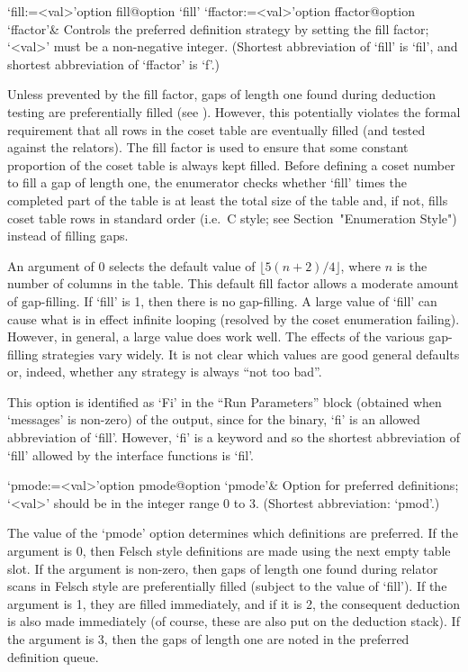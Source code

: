 \beginitems

\>`fill:=<val>'{option fill}@{option `fill'}
\>`ffactor:=<val>'{option ffactor}@{option `ffactor'}&
Controls the preferred definition strategy by setting the fill factor;
`<val>' must be a non-negative integer.
(Shortest abbreviation of `fill' is `fil', and  shortest  abbreviation
of `ffactor' is `f'.)

Unless prevented by the fill factor, gaps of length one  found  during
deduction  testing  are  preferentially   filled   (see \cite{Hav91}).
However, this potentially violates the  formal  requirement  that  all
rows in the coset table are eventually filled (and tested against  the
relators). The fill factor  is  used  to  ensure  that  some  constant
proportion of the coset table is always kept filled. Before defining a
coset number to fill a  gap  of  length  one,  the  enumerator  checks
whether `fill' times the completed part of the table is at  least  the
total size of the table  and,  if  not,  fills  coset  table  rows  in
standard order (i.e.~C style; see Section~"Enumeration Style") instead
of filling gaps.

An  argument of  0  selects  the default  value  of $\lfloor  5(n+2)/4
\rfloor$,  where $n$  is the  number of  columns in  the  table.  This
default  fill factor  allows  a moderate  amount  of gap-filling.   If
`fill' is  1, then there is  no gap-filling.  A large  value of `fill'
can cause  what is in effect  infinite looping (resolved  by the coset
enumeration failing).   However, in general,  a large value  does work
well.  The  effects of the various gap-filling  strategies vary widely.
It is  not clear  which values are  good general defaults  or, indeed,
whether any strategy is always ``not too bad''.

This option is identified as `Fi'  in  the  ``Run  Parameters''  block
(obtained when `messages' is non-zero) of the {\ACE} output, since for
the {\ACE} binary, `fi' is an allowed abbreviation of `fill'. However,
`fi' is a {\GAP} keyword and so the shortest  abbreviation  of  `fill'
allowed by the interface functions is `fil'.

\>`pmode:=<val>'{option pmode}@{option `pmode'}&
Option for preferred definitions; `<val>' should  be  in  the  integer
range 0 to 3. (Shortest abbreviation: `pmod'.)

The  value of  the  `pmode' option  determines  which definitions  are
preferred.  If  the argument is  0, then Felsch style  definitions are
made using  the next empty table  slot.  If the  argument is non-zero,
then gaps of length one found during relator scans in Felsch style are
preferentially  filled  (subject to  the  value  of  `fill').  If  the
argument  is 1,  they are  filled  immediately, and  if it  is 2,  the
consequent deduction  is also made  immediately (of course,  these are
also put on the deduction stack).  If the argument is 3, then the gaps
of length one are noted in the preferred definition queue.

